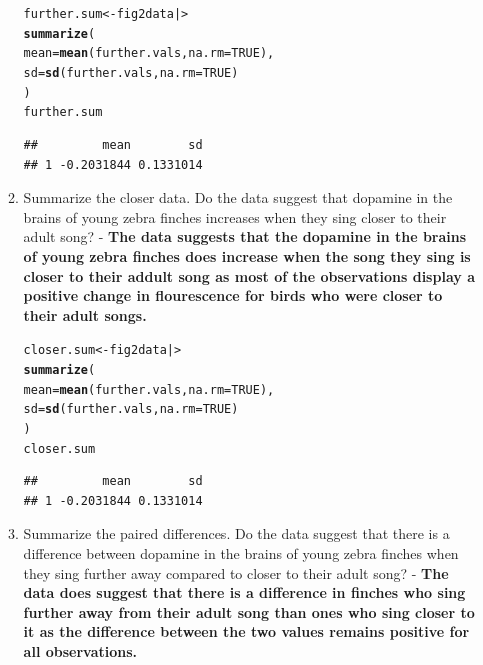 \documentclass{article}\usepackage[]{graphicx}\usepackage[]{xcolor}
\makeatletter
\newcommand{\hlnum}[1]{\textcolor[rgb]{0.686,0.059,0.569}{#1}}%
\newcommand{\hldef}[1]{\textcolor[rgb]{0.345,0.345,0.345}{#1}}%
\newcommand{\hlkwb}[1]{\textcolor[rgb]{0.69,0.353,0.396}{#1}}%
\newcommand{\hlkwc}[1]{\textcolor[rgb]{0.333,0.667,0.333}{#1}}%
\newcommand{\hlkwd}[1]{\textcolor[rgb]{0.737,0.353,0.396}{\textbf{#1}}}%
\newenvironment{kframe}{%
 \def\at@end@of@kframe{}%
 \ifinner\ifhmode%
  \def\at@end@of@kframe{\end{minipage}}%
  \begin{minipage}{\columnwidth}%
 \fi\fi%
 \def\FrameCommand##1{\hskip\@totalleftmargin \hskip-\fboxsep
 \colorbox{shadecolor}{##1}\hskip-\fboxsep
     \hskip-\linewidth \hskip-\@totalleftmargin \hskip\columnwidth}%
 \MakeFramed {\advance\hsize-\width
   \@totalleftmargin\z@ \linewidth\hsize
   \@setminipage}}%
 {\par\unskip\endMakeFramed%
 \at@end@of@kframe}
\newenvironment{knitrout}{}{} %
\makeatother
\begin{document}
\begin{enumerate}
\begin{enumerate}
\begin{knitrout}
\begin{kframe}
\begin{alltt}
\hldef{further.sum} \hlkwb{<-} \hldef{fig2data |>}
\hlkwd{summarize}\hldef{(}
  \hlkwc{mean} \hldef{=} \hlkwd{mean}\hldef{(further.vals,} \hlkwc{na.rm} \hldef{=} \hlnum{TRUE}\hldef{),}
  \hlkwc{sd} \hldef{=} \hlkwd{sd}\hldef{(further.vals,} \hlkwc{na.rm} \hldef{=} \hlnum{TRUE}\hldef{)}
\hldef{)}
\hldef{further.sum}
\end{alltt}
\begin{verbatim}
##         mean        sd
## 1 -0.2031844 0.1331014
\end{verbatim}
\end{kframe}
\end{knitrout}
   \item Summarize the closer data. Do the data suggest that
   dopamine in the brains of young zebra finches increases when
   they sing closer to their adult song? - \textbf{The data suggests that the dopamine in the brains of young zebra finches does increase when the song they sing is closer to their addult song as most of the observations display a positive change in flourescence for birds who were closer to their adult songs.}
\begin{knitrout}\scriptsize
{}\color{fgcolor}\begin{kframe}
\begin{alltt}
\hldef{closer.sum} \hlkwb{<-} \hldef{fig2data |>}
  \hlkwd{summarize}\hldef{(}
 \hlkwc{mean} \hldef{=} \hlkwd{mean}\hldef{(further.vals,} \hlkwc{na.rm} \hldef{=} \hlnum{TRUE}\hldef{),}
 \hlkwc{sd} \hldef{=} \hlkwd{sd}\hldef{(further.vals,} \hlkwc{na.rm} \hldef{=} \hlnum{TRUE}\hldef{)}
  \hldef{)}
\hldef{closer.sum}
\end{alltt}
\begin{verbatim}
##         mean        sd
## 1 -0.2031844 0.1331014
\end{verbatim}
\end{kframe}
\end{knitrout}
  \item Summarize the paired differences. Do the data suggest
  that there is a difference between dopamine in the brains of
  young zebra finches when they sing further away compared to 
  closer to their adult song? - \textbf{The data does suggest that there is a difference in finches who sing further away from their adult song than ones who sing closer to it as the difference between the two values remains positive for all observations.}
\begin{knitrout}\scriptsize
{}\color{fgcolor}\begin{kframe}

\end{kframe}
\end{knitrout}
\end{enumerate}
\end{enumerate}
\end{document}
